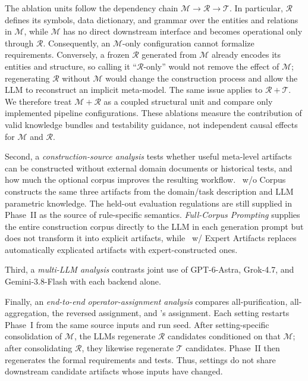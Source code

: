 The ablation units follow the dependency chain
$\mathcal{M}\rightarrow\mathcal{R}\rightarrow\mathcal{T}$. In particular,
$\mathcal{R}$ defines its symbols, data dictionary, and grammar over the
entities and relations in $\mathcal{M}$, while $\mathcal{M}$ has no direct
downstream interface and becomes operational only through $\mathcal{R}$.
Consequently, an $\mathcal{M}$-only configuration cannot formalize
requirements. Conversely, a frozen $\mathcal{R}$ generated from $\mathcal{M}$
already encodes its entities and structure, so calling it
``$\mathcal{R}$-only'' would not remove the effect of $\mathcal{M}$; regenerating
$\mathcal{R}$ without $\mathcal{M}$ would change the construction process and
allow the LLM to reconstruct an implicit meta-model. The same issue applies to
$\mathcal{R}{+}\mathcal{T}$. We therefore treat
$\mathcal{M}{+}\mathcal{R}$ as a coupled structural unit and compare only
implemented pipeline configurations. These ablations measure the contribution
of valid knowledge bundles and testability guidance, not independent causal
effects for $\mathcal{M}$ and $\mathcal{R}$.

Second, a \emph{construction-source analysis} tests whether useful meta-level
artifacts can be constructed without external domain documents or historical
tests, and how much the optional corpus improves the resulting workflow.
\ourtool\ w/o Corpus constructs the same three artifacts from the domain/task
description and LLM parametric knowledge. The held-out evaluation regulations
are still supplied in Phase~II as the source of rule-specific semantics.
\textit{Full-Corpus Prompting} supplies the entire construction corpus directly
to the LLM in each generation prompt but does not transform it into explicit
artifacts, while
\ourtool\ w/ Expert Artifacts replaces automatically explicated artifacts with
expert-constructed ones.

Third, a \emph{multi-LLM analysis} contrasts joint use
of GPT-6-Astra, Grok-4.7, and Gemini-3.8-Flash with each backend alone.

Finally, an \emph{end-to-end operator-assignment analysis} compares
all-purification, all-aggregation, the reversed assignment, and \ourtool's
assignment. Each setting restarts Phase~I from the same source inputs and run
seed. After setting-specific consolidation of $\mathcal{M}$, the LLMs
regenerate $\mathcal{R}$ candidates conditioned on that $\mathcal{M}$; after
consolidating $\mathcal{R}$, they likewise regenerate $\mathcal{T}$ candidates.
Phase~II then regenerates the formal requirements and tests. Thus, settings do
not share downstream candidate artifacts whose inputs have changed.

